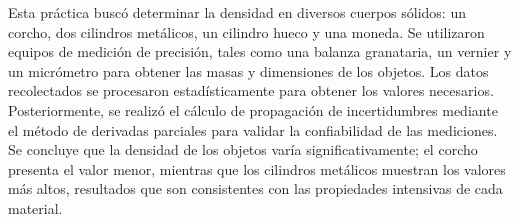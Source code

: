 Esta práctica buscó determinar la densidad 
en diversos cuerpos sólidos: un corcho, 
dos cilindros metálicos, un cilindro hueco y una 
moneda. Se utilizaron equipos de medición de precisión, 
tales como una balanza granataria, un vernier y un micrómetro 
para obtener las masas y dimensiones de los objetos. Los datos 
recolectados se procesaron estadísticamente para obtener los valores 
necesarios. Posteriormente, se realizó el cálculo de propagación de 
incertidumbres mediante el método de derivadas parciales para validar 
la confiabilidad de las mediciones. Se concluye que la densidad de los 
objetos varía significativamente; el corcho presenta el valor 
menor, mientras que los cilindros metálicos muestran los valores 
más altos, resultados 
que son consistentes con las propiedades intensivas de cada material. 